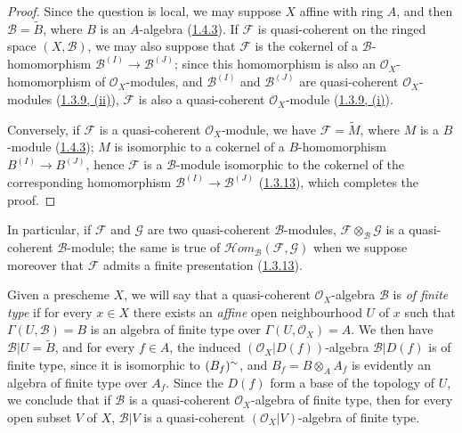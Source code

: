 \begin{proof}
Since the question is local, we may suppose $X$ affine with ring $A$, and
then $\mathscr{B}=\widetilde{B}$, where $B$ is an $A$-algebra
(\hyperref[I.1.4.3]{1.4.3}). If $\mathscr{F}$ is quasi-coherent on
the ringed space $(X,\mathscr{B})$, we may also suppose that
$\mathscr{F}$ is the cokernel of a $\mathscr{B}$-homomorphism
$\mathscr{B}^{(I)}\to\mathscr{B}^{(J)}$; since this homomorphism is
also an $\mathscr{O}_X$-homomorphism of $\mathscr{O}_X$-modules, and
$\mathscr{B}^{(I)}$ and $\mathscr{B}^{(J)}$ are quasi-coherent
$\mathscr{O}_X$-modules
(\hyperref[I.1.3.9]{1.3.9, (ii)}), $\mathscr{F}$ is also a
quasi-coherent $\mathscr{O}_X$-module
(\hyperref[I.1.3.9]{1.3.9, (i)}).

Conversely, if $\mathscr{F}$ is a quasi-coherent $\mathscr{O}_X$-module,
we have $\mathscr{F}=\widetilde{M}$, where $M$ is a $B$-module
(\hyperref[I.1.4.3]{1.4.3}); $M$ is isomorphic to a cokernel of a
$B$-homomorphism $B^{(I)}\to B^{(J)}$, hence $\mathscr{F}$ is a
$\mathscr{B}$-module isomorphic to the cokernel of the corresponding
homomorphism $\mathscr{B}^{(I)}\to\mathscr{B}^{(J)}$
(\hyperref[I.1.3.13]{1.3.13}), which completes the proof.
\end{proof}

In particular, if $\mathscr{F}$ and $\mathscr{G}$ are two quasi-coherent
$\mathscr{B}$-modules,
$\mathscr{F}\otimes_{\mathscr{B}}\mathscr{G}$ is a quasi-coherent
$\mathscr{B}$-module; the same is true of
$\mathscr{H}\!om_{\mathscr{B}}(\mathscr{F},\mathscr{G})$ when we suppose
moreover that $\mathscr{F}$ admits a finite presentation
(\hyperref[I.1.3.13]{1.3.13}).

\begin{env}[9.6.2]
\label{I.9.6.2}
Given a prescheme $X$, we will say that a quasi-coherent
$\mathscr{O}_X$-algebra $\mathscr{B}$ is \emph{of finite type} if for every
$x\in X$ there exists an \emph{affine} open neighbourhood $U$ of $x$ such
that $\Gamma(U,\mathscr{B})=B$ is an algebra of finite type over
$\Gamma(U,\mathscr{O}_X)=A$. We then have $\mathscr{B}|U=\widetilde{B}$,
and for every $f\in A$, the induced $(\mathscr{O}_X|D(f))$-algebra
$\mathscr{B}|D(f)$ is of finite type, since it is isomorphic to
$(B_f)^{\sim}$, and $B_f=B\otimes_A A_f$ is evidently an algebra of
finite type over $A_f$. Since the $D(f)$ form a base of the topology of
$U$, we conclude that if $\mathscr{B}$ is a quasi-coherent
$\mathscr{O}_X$-algebra of finite type, then for every open subset $V$ of
$X$, $\mathscr{B}|V$ is a quasi-coherent $(\mathscr{O}_X|V)$-algebra of
finite type.
\end{env}

